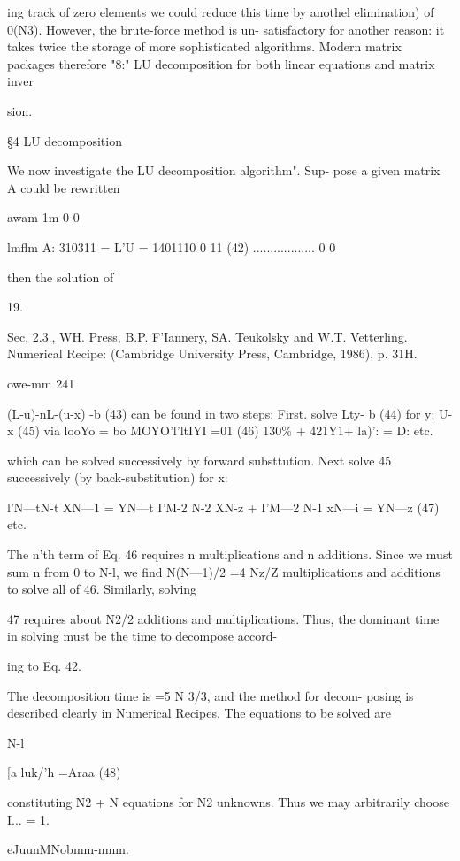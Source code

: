 {{{{{{{{ing track of zero elements we could reduce this time by anothel
elimination) of 0(N3). However, the brute-force method is un-
satisfactory for another reason: it takes twice the storage of more
sophisticated algorithms. Modern matrix packages therefore "8:"
LU decomposition for both linear equations and matrix inver~

sion.

 

\S4 LU decomposition

We now investigate the LU decomposition algorithm". Sup-
pose a given matrix A could be rewritten

awam 1m 0 0 }lmflm
A: 310311 = L'U = 1401110 0  11 (42)
.................. 0 0

then the solution of

 

19.

Sec, 2.3., WH. Press, B.P. F'Iannery, SA. Teukolsky and W.T. Vetterling. Numerical Recipe:
(Cambridge University Press, Cambridge, 1986), p. 31H.

owe-mm 241

(L-u)-nL-(u-x) -b (43)
can be found in two steps: First. solve
Lty- b (44)
for
y: U-x (45)
via
looYo = bo
MOYO'l'ltIYI =01 (46)
130\% + 421Y1+ la)': = D:
etc.

which can be solved successively by forward substtution. Next
solve 45 successively (by back-substitution) for x:

l'N—tN-t XN—1 = YN—t
I'M-2 N-2 XN-z + I'M—2 N-1 xN—i = YN—z (47)
etc.

The n'th term of Eq. 46 requires n multiplications and n additions.
Since we must sum n from 0 to N-l, we find N(N—1)/2 =4 Nz/Z
multiplications and additions to solve all of 46. Similarly, solving

47 requires about N2/2 additions and multiplications. Thus, the
dominant time in solving must be the time to decompose accord-

ing to Eq. 42.

The decomposition time is =5 N 3/3, and the method for decom-
posing is described clearly in Numerical Recipes. The equations
to be solved are

N-l

[a luk/'h =Araa (48)

constituting N2 + N equations for N2 unknowns. Thus we may
arbitrarily choose I... = 1.

eJuunMNobmm-nmm.

}}}}}}}
